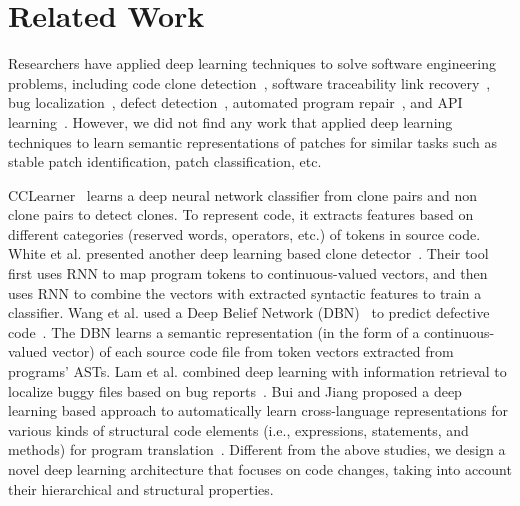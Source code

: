 \section{Related Work}
\label{sec:related_work}

Researchers have applied deep learning techniques to solve software
engineering problems, including code clone
detection~\cite{white2016deep,li2017cclearner,bui2018hierarchical}, software traceability link
recovery~\cite{guo2017semantically}, bug
localization~\cite{huo2016learning, lam2017bug}, defect
detection~\cite{yang2015deep, wang2016automatically}, automated program
repair~\cite{gupta2017deepfix}, and API
learning~\cite{gu2016deep}. However, we did not find any work that applied
deep learning techniques to learn semantic representations of patches for
similar tasks such as stable patch identification, patch classification, etc.



CCLearner~\cite{li2017cclearner} learns a deep neural network classifier
from clone pairs and non clone pairs to detect clones.  To represent code,
it extracts features based on different categories (reserved words,
operators, etc.) of tokens in source code. White et al. presented another
deep learning based clone detector~\cite{white2016deep}. Their tool first
uses RNN to map program tokens to continuous-valued vectors, and then uses
RNN to combine the vectors with extracted syntactic features to train a
classifier. Wang et al. used a Deep Belief Network
(DBN)~\cite{hinton2009deep} to predict defective
code~\cite{wang2016automatically}. The DBN learns a semantic representation
(in the form of a continuous-valued vector) of each source code file from
token vectors extracted from programs' ASTs. Lam et al. combined deep
learning with information
retrieval to localize
buggy files based on bug reports~\cite{lam2017bug}. Bui and Jiang
proposed a deep learning based approach to automatically learn
cross-language representations for various kinds of structural code
elements (i.e., expressions, statements, and methods) for program
translation~\cite{bui2018hierarchical}. Different from the above
studies, we design a novel deep learning architecture that focuses on code
changes, taking into account their hierarchical and structural properties.

